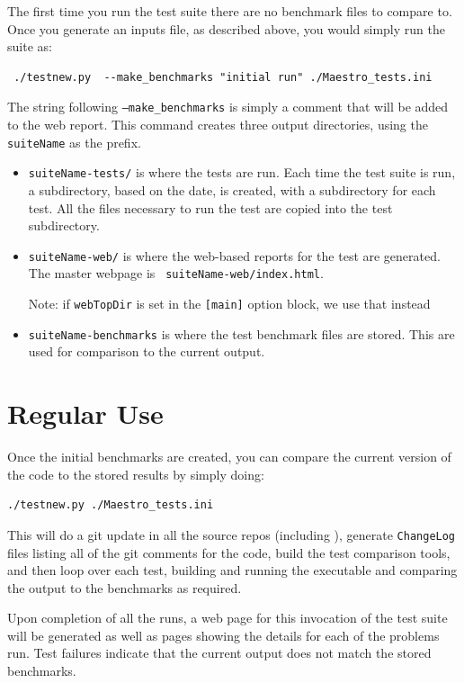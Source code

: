 The first time you run the test suite there are no benchmark files to
compare to.  Once you generate an inputs file, as described above, you
would simply run the suite as:
\begin{verbatim}
 ./testnew.py  --make_benchmarks "initial run" ./Maestro_tests.ini
\end{verbatim}
The string following {\tt --make\_benchmarks} is simply a comment that
will be added to the web report.  This command creates three output
directories, using the {\tt suiteName} as the prefix.
\begin{itemize}
\item {\tt suiteName-tests/} is where the tests are run.  Each time the
  test suite is run, a subdirectory, based on the date, is created,
  with a subdirectory for each test.  All the files necessary to run
  the test are copied into the test subdirectory.

\item {\tt suiteName-web/} is where the web-based reports for the test
  are generated.  The master webpage is {\tt
    suiteName-web/index.html}.

  Note: if {\tt webTopDir} is set in the {\tt [main]} option block, we
  use that instead

\item {\tt suiteName-benchmarks} is where the test benchmark files are
  stored.  This are used for comparison to the current output.
\end{itemize}



\section{Regular Use}

Once the initial benchmarks are created, you can compare the current
version of the code to the stored results by simply doing:
\begin{verbatim}
./testnew.py ./Maestro_tests.ini
\end{verbatim}
This will do a git update in all the source repos (including \boxlib),
generate {\tt ChangeLog} files listing all of the git comments for the
code, build the test comparison tools, and then loop over each test,
building and running the executable and comparing the output to the
benchmarks as required.

Upon completion of all the runs, a web page for this invocation of the
test suite will be generated as well as pages showing the details for
each of the problems run.  Test failures indicate that the current
output does not match the stored benchmarks.

